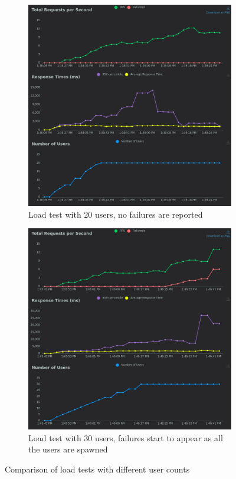 \begin{figure}[H]
    \centering
    \begin{subfigure}{0.49\textwidth}
        \includegraphics[width=\linewidth]{./images/ex1/20-users.png}
        \caption{Load test with 20 users, no failures are reported}
        \label{fig:locust-20-users}
    \end{subfigure}
    \hfill
    \begin{subfigure}{0.49\textwidth}
        \includegraphics[width=\linewidth]{./images/ex1/30-users.png}
        \caption{Load test with 30 users, failures start to appear as all the users are spawned}
        \label{fig:locust-30-users}
    \end{subfigure}
    \caption{Comparison of load tests with different user counts}
    \label{fig:locust-load-tests}
\end{figure}

